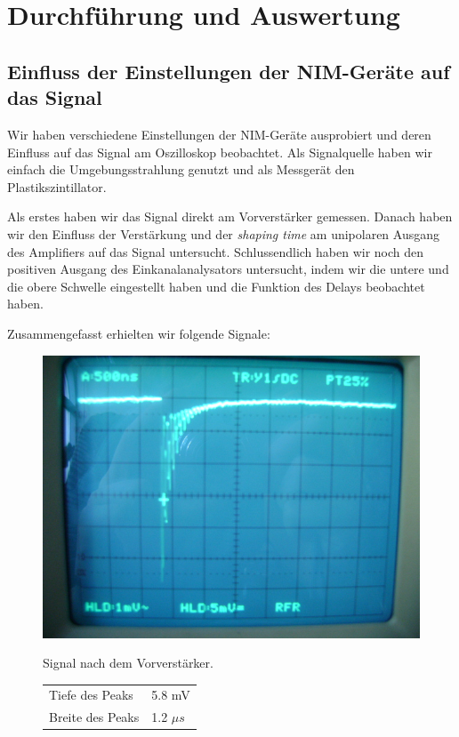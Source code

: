 \section{Durchführung und Auswertung}

\subsection{Einfluss der Einstellungen der NIM-Geräte auf das Signal}

Wir haben verschiedene Einstellungen der NIM-Geräte ausprobiert und deren Einfluss auf das Signal am Oszilloskop beobachtet. Als Signalquelle haben wir einfach die Umgebungsstrahlung genutzt und als Messgerät den Plastikszintillator.

Als erstes haben wir das Signal direkt am Vorverstärker gemessen. Danach haben wir den Einfluss der Verstärkung und der \emph{shaping time} am unipolaren Ausgang des Amplifiers auf das Signal untersucht. Schlussendlich haben wir noch den positiven Ausgang des Einkanalanalysators untersucht, indem wir die untere und die obere Schwelle eingestellt haben und die Funktion des Delays beobachtet haben.

Zusammengefasst erhielten wir folgende Signale:

\begin{figure}[H]
\begin{minipage}{0.4\textwidth}
\centering \includegraphics[width = \textwidth]{messergebnisse/1.JPG}
\end{minipage}
\begin{minipage}{0.59\textwidth}
Signal nach dem Vorverstärker.
\centering \begin{tabular}{l l}
Tiefe des Peaks & 5.8 mV\\
Breite des Peaks & 1.2 $\mu s$
\end{tabular}
\end{minipage}
\end{figure}

